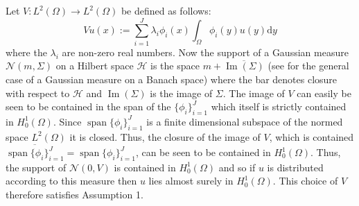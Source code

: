 Let $V:L^{2}(\Omega)\rightarrow L^{2}(\Omega)$ be defined as follows:
\begin{equation}
    \label{FEM_prior}
    Vu(x):=\sum_{i=1}^{J}\lambda_{i}\phi_{i}(x)\int_{\Omega}\phi_{i}(y)u(y)\mathrm{d}y
\end{equation}
where the $\lambda_{i}$ are non-zero real numbers. Now the support of a Gaussian measure $\mathcal{N}(m,\Sigma)$ on a Hilbert space $\mathcal{H}$ is the space $m+\overline{\operatorname{Im}(\Sigma)}$ (see \textcolor{blue}{\citep{vakhania1975topological}} for the general case of a Gaussian measure on a Banach space) where the bar denotes closure with respect to $\mathcal{H}$ and $\operatorname{Im}(\Sigma)$ is the image of $\Sigma$. The image of $V$ can easily be seen to be contained in the span of the $\{\phi_{i}\}_{i=1}^{J}$ which itself is strictly contained in $H_{0}^{1}(\Omega)$. Since $\operatorname{span}\{\phi_{i}\}_{i=1}^{J}$ is a finite dimensional subspace of the normed space $L^{2}(\Omega)$ it is closed. Thus, the closure of the image of $V$, which is contained $\overline{\operatorname{span}\{\phi_{i}\}_{i=1}^{J}}=\operatorname{span}\{\phi_{i}\}_{i=1}^{J}$, can be seen to be contained in $H_{0}^{1}(\Omega)$. Thus, the support of $\mathcal{N}(0,V)$ is contained in $H_{0}^{1}(\Omega)$ and so if $u$ is distributed according to this measure then $u$ lies almost surely in $H_{0}^{1}(\Omega)$. This choice of $V$ therefore satisfies Assumption 1. \vspace{5pt}

